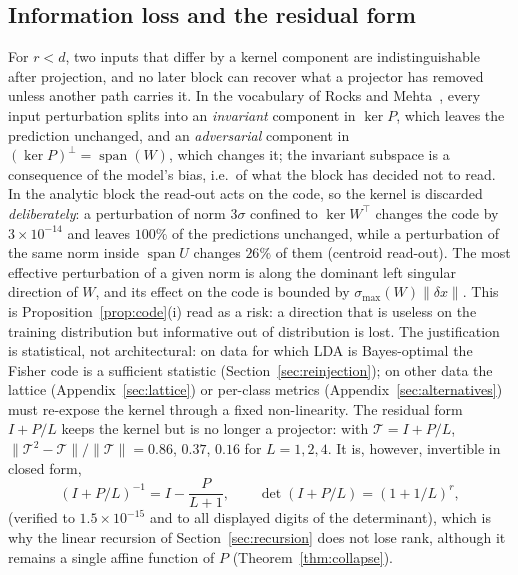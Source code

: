 \documentclass[11pt,a4paper]{article}
\theoremstyle{plain}
\theoremstyle{definition}
\theoremstyle{remark}
\newcommand{\spn}{\operatorname{span}}
\newcommand{\T}{\top}
\begin{document}
\subsection{Information loss and the residual form}
For $r<d$, two inputs that differ by a kernel component are
indistinguishable after projection, and no later block can recover what a
projector has removed unless another path carries it. In the vocabulary of
Rocks and Mehta~\cite{rocksmehta2021}, every input perturbation splits into
an \emph{invariant} component in $\ker P$, which leaves the prediction
unchanged, and an \emph{adversarial} component in $(\ker P)^\perp=\spn(W)$,
which changes it; the invariant subspace is a consequence of the model's
bias, i.e.\ of what the block has decided not to read. In the analytic
block the read-out acts on the code, so the kernel is discarded
\emph{deliberately}: a perturbation of norm $3\sigma$ confined to
$\ker W^\T$ changes the code by $3\times10^{-14}$ and leaves $100\%$ of the
predictions unchanged, while a perturbation of the same norm inside $\spn U$
changes $26\%$ of them (centroid read-out). The most effective perturbation of a given norm is
along the dominant left singular direction of $W$, and its effect on the code
is bounded by $\sigma_{\max}(W)\|\delta x\|$. This is Proposition~\ref{prop:code}(i) read as a
risk: a direction that is useless on the training distribution but
informative out of distribution is lost. The justification is statistical,
not architectural: on data for which LDA is Bayes-optimal the Fisher code is
a sufficient statistic (Section~\ref{sec:reinjection}); on other data the
lattice (Appendix~\ref{sec:lattice}) or per-class metrics
(Appendix~\ref{sec:alternatives}) must re-expose the kernel through a fixed
non-linearity. The residual form $I+P/L$ keeps the kernel but is no
longer a projector: with $\mathcal T=I+P/L$,
$\|\mathcal T^2-\mathcal T\|/\|\mathcal T\|=0.86$, $0.37$, $0.16$ for
$L=1,2,4$. It is, however, invertible in closed form,
\begin{equation}
  (I+P/L)^{-1}=I-\frac{P}{L+1},\qquad\det(I+P/L)=(1+1/L)^r,
  \label{eq:resid-inverse}
\end{equation}
(verified to $1.5\times10^{-15}$ and to all displayed digits of the
determinant), which is why the linear recursion of
Section~\ref{sec:recursion} does not lose rank, although it remains a
single affine function of $P$ (Theorem~\ref{thm:collapse}).
\end{document}
